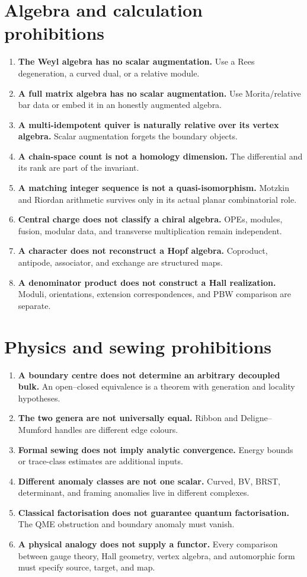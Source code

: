 \section{Algebra and calculation prohibitions}
\begin{enumerate}[resume*=nogo,label=\textbf{N\arabic*.}]
\item \textbf{The Weyl algebra has no scalar augmentation.}  Use a Rees degeneration, a curved dual, or a relative module.
\item \textbf{A full matrix algebra has no scalar augmentation.}  Use Morita/relative bar data or embed it in an honestly augmented algebra.
\item \textbf{A multi-idempotent quiver is naturally relative over its vertex algebra.}  Scalar augmentation forgets the boundary objects.
\item \textbf{A chain-space count is not a homology dimension.}  The differential and its rank are part of the invariant.
\item \textbf{A matching integer sequence is not a quasi-isomorphism.}  Motzkin and Riordan arithmetic survives only in its actual planar combinatorial role.
\item \textbf{Central charge does not classify a chiral algebra.}  OPEs, modules, fusion, modular data, and transverse multiplication remain independent.
\item \textbf{A character does not reconstruct a Hopf algebra.}  Coproduct, antipode, associator, and exchange are structured maps.
\item \textbf{A denominator product does not construct a Hall realization.}  Moduli, orientations, extension correspondences, and PBW comparison are separate.
\end{enumerate}

\section{Physics and sewing prohibitions}
\begin{enumerate}[resume*=nogo,label=\textbf{N\arabic*.}]
\item \textbf{A boundary centre does not determine an arbitrary decoupled bulk.}  An open--closed equivalence is a theorem with generation and locality hypotheses.
\item \textbf{The two genera are not universally equal.}  Ribbon and Deligne--Mumford handles are different edge colours.
\item \textbf{Formal sewing does not imply analytic convergence.}  Energy bounds or trace-class estimates are additional inputs.
\item \textbf{Different anomaly classes are not one scalar.}  Curved, BV, BRST, determinant, and framing anomalies live in different complexes.
\item \textbf{Classical factorisation does not guarantee quantum factorisation.}  The QME obstruction and boundary anomaly must vanish.
\item \textbf{A physical analogy does not supply a functor.}  Every comparison between gauge theory, Hall geometry, vertex algebra, and automorphic form must specify source, target, and map.
\end{enumerate}


